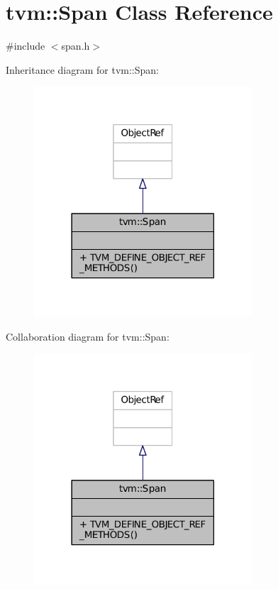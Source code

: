 \hypertarget{classtvm_1_1Span}{}\section{tvm\+:\+:Span Class Reference}
\label{classtvm_1_1Span}


{\ttfamily \#include $<$span.\+h$>$}



Inheritance diagram for tvm\+:\+:Span\+:
\nopagebreak
\begin{figure}[H]
\begin{center}
\leavevmode
\includegraphics[width=230pt]{classtvm_1_1Span__inherit__graph}
\end{center}
\end{figure}


Collaboration diagram for tvm\+:\+:Span\+:
\nopagebreak
\begin{figure}[H]
\begin{center}
\leavevmode
\includegraphics[width=230pt]{classtvm_1_1Span__coll__graph}
\end{center}
\end{figure}

